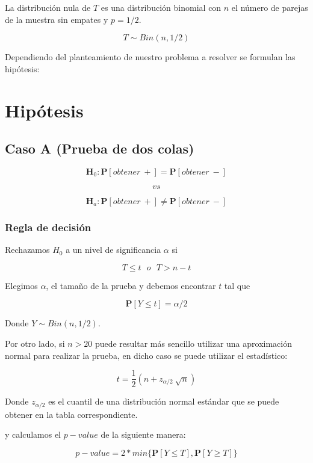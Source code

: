 \documentclass[
  a4paper,
  oneside,
  openany]{book}
\begin{document}
La distribución nula de \(T\) es una distribución binomial con \(n\) el número de parejas de la muestra sin empates y \(p=1/2\).

\[T\sim Bin(n,1/2)\]

Dependiendo del planteamiento de nuestro problema a resolver se formulan las hipótesis:

\hypertarget{hipuxf3tesis-4}{%
\section{Hipótesis}\label{hipuxf3tesis-4}}

\hypertarget{caso-a-prueba-de-dos-colas-4}{%
\subsection*{Caso A (Prueba de dos colas)}\label{caso-a-prueba-de-dos-colas-4}}


\[\textbf{H}_0: \mathbf{P}[obtener\ +]= \mathbf{P}[obtener\ -]\]

\[vs\]

\[\textbf{H}_a: \mathbf{P}[obtener\ +] \neq \mathbf{P}[obtener\ -]\]

\hypertarget{regla-de-decisiuxf3n-10}{%
\subsubsection*{Regla de decisión}\label{regla-de-decisiuxf3n-10}}


Rechazamos \(H_0\) a un nivel de significancia \(\alpha\) si

\[T \leq t \ \ \  o \ \ \ T>n-t\]

Elegimos \(\alpha\), el tamaño de la prueba y debemos encontrar \(t\) tal que

\[\mathbf{P}[Y \leq t]=\alpha/2\]

Donde \(Y \sim Bin (n,1/2)\).

Por otro lado, si \(n>20\) puede resultar más sencillo utilizar una aproximación normal para realizar la prueba, en dicho caso se puede utilizar el estadístico:

\[t=\frac{1}{2}\left(n+z_{\alpha/2}\ \sqrt{n}\right)\]

Donde \(z_{\alpha/2}\) es el cuantil de una distribución normal estándar que se puede obtener en la tabla correspondiente.

y calculamos el \(p-value\) de la siguiente manera:

\[p-value=2*min\{\mathbf{P}[Y\leq T],\mathbf{P}[Y\geq T]\}\]
\end{document}
